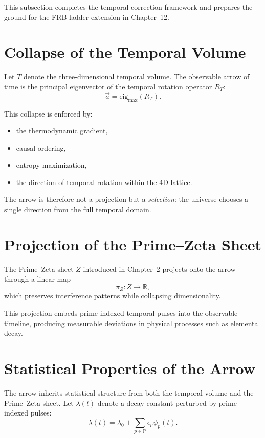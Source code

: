 \documentclass[11pt, letterpaper, openany]{book}
\begin{document}
This subsection completes the temporal correction framework and prepares the ground for the FRB 
ladder extension in Chapter~12.


\section{Collapse of the Temporal Volume}

Let $T$ denote the three-dimensional temporal volume. 
The observable arrow of time is the principal eigenvector of the temporal 
rotation operator $R_T$:
\[
\vec{a} = \mathrm{eig}_{\max}(R_T).
\]

This collapse is enforced by:

\begin{itemize}
    \item the thermodynamic gradient,
    \item causal ordering,
    \item entropy maximization,
    \item the direction of temporal rotation within the 4D lattice.
\end{itemize}

The arrow is therefore not a projection but a \emph{selection}: 
the universe chooses a single direction from the full temporal domain.

\section{Projection of the Prime--Zeta Sheet}

The Prime--Zeta sheet $Z$ introduced in Chapter~2 projects onto the arrow 
through a linear map
\[
\pi_Z : Z \rightarrow \mathbb{R},
\]
which preserves interference patterns while collapsing dimensionality.

This projection embeds prime-indexed temporal pulses into the observable 
timeline, producing measurable deviations in physical processes such as 
elemental decay.

\section{Statistical Properties of the Arrow}

The arrow inherits statistical structure from both the temporal volume and 
the Prime--Zeta sheet. 
Let $\lambda(t)$ denote a decay constant perturbed by prime-indexed pulses:
\[
\lambda(t) = \lambda_0 + \sum_{p \in \mathbb{P}} \epsilon_p \psi_p(t).
\]
\end{document}
